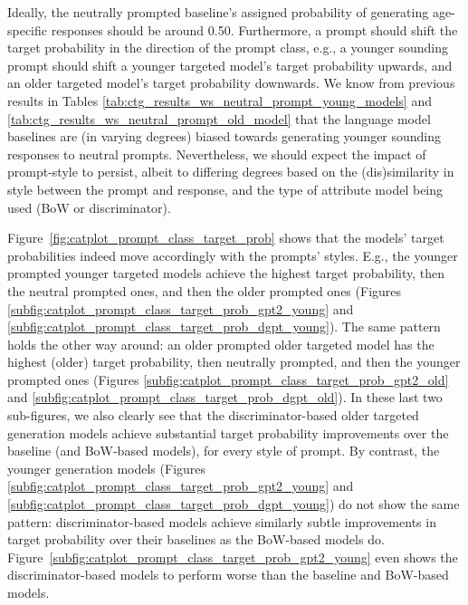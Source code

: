 Ideally, the neutrally prompted baseline's assigned probability of generating age-specific responses should be around 0.50. Furthermore, a prompt should shift the target probability in the direction of the prompt class, e.g., a younger sounding prompt should shift a younger targeted model's target probability upwards, and an older targeted model's target probability downwards. We know from previous results in Tables \ref{tab:ctg_results_ws_neutral_prompt_young_models} and \ref{tab:ctg_results_ws_neutral_prompt_old_model} that the language model baselines are (in varying degrees) biased towards generating younger sounding responses to neutral prompts. Nevertheless, we should expect the impact of prompt-style to persist, albeit to differing degrees based on the (dis)similarity in style between the prompt and response, and the type of attribute model being used (BoW or discriminator).


Figure~\ref{fig:catplot_prompt_class_target_prob}
shows that the models' target probabilities indeed move accordingly with the prompts' styles. E.g., the younger prompted younger targeted models achieve the highest target probability, then the neutral prompted ones, and then the older prompted ones (Figures \ref{subfig:catplot_prompt_class_target_prob_gpt2_young} and \ref{subfig:catplot_prompt_class_target_prob_dgpt_young}). The same pattern holds the other way around: an older prompted older targeted model has the highest (older) target probability, then neutrally prompted, and then the younger prompted ones (Figures \ref{subfig:catplot_prompt_class_target_prob_gpt2_old} and \ref{subfig:catplot_prompt_class_target_prob_dgpt_old}). In these last two sub-figures, we also clearly see that the discriminator-based older targeted generation models achieve substantial target probability improvements over the baseline (and BoW-based models), for every style of prompt. By contrast, the younger generation models (Figures \ref{subfig:catplot_prompt_class_target_prob_gpt2_young} and \ref{subfig:catplot_prompt_class_target_prob_dgpt_young}) do not show the same pattern: discriminator-based models achieve similarly subtle improvements in target probability over their baselines as the BoW-based models do. Figure~\ref{subfig:catplot_prompt_class_target_prob_gpt2_young} even shows the discriminator-based models to perform worse than the baseline and BoW-based models.


